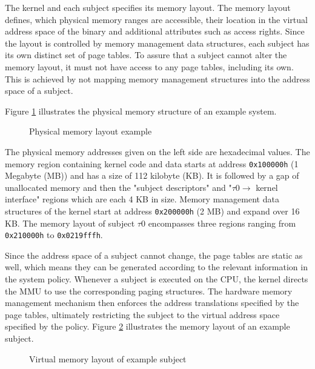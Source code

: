The kernel and each subject specifies its memory layout. The memory layout
defines, which physical memory ranges are accessible, their location in the
virtual address space of the binary and additional attributes such as access
rights. Since the layout is controlled by memory management data structures,
each subject has its own distinct set of page tables. To assure that a subject
cannot alter the memory layout, it must not have access to any page tables,
including its own. This is achieved by not mapping memory management structures
into the address space of a subject.

Figure \ref{fig:phys-mem-layout-example} illustrates the physical memory
structure of an example system.

\begin{figure}[h]
	\centering
	
	\caption{Physical memory layout example}
	\label{fig:phys-mem-layout-example}
\end{figure}

The physical memory addresses given on the left side are hexadecimal values.
The memory region containing kernel code and data starts at address
\texttt{0x100000h} (1 Megabyte (MB)) and has a size of 112 kilobyte (KB). It is
followed by a gap of unallocated memory and then the "subject descriptors" and
"$\tau0\rightarrow$ kernel interface" regions which are each 4 KB in size.
Memory management data structures of the kernel start at address
\texttt{0x200000h} (2 MB) and expand over 16 KB. The memory layout of subject
$\tau0$ encompasses three regions ranging from \texttt{0x210000h} to
\texttt{0x0219fffh}.

Since the address space of a subject cannot change, the page tables are static
as well, which means they can be generated according to the relevant information
in the system policy. Whenever a subject is executed on the CPU, the kernel
directs the MMU to use the corresponding paging structures. The hardware memory
management mechanism then enforces the address translations specified by the
page tables, ultimately restricting the subject to the virtual address space
specified by the policy. Figure \ref{fig:virt-mem-layout-example} illustrates
the memory layout of an example subject.

\begin{figure}[h]
	\centering
	
	\caption{Virtual memory layout of example subject}
	\label{fig:virt-mem-layout-example}
\end{figure}


